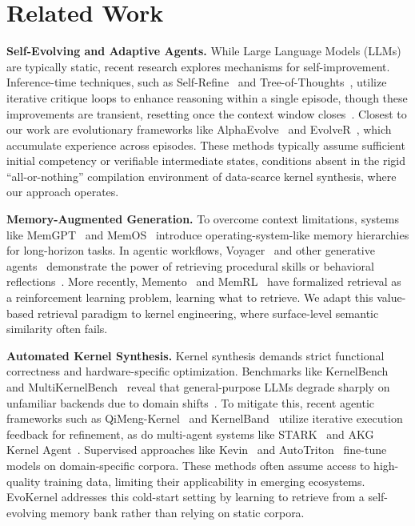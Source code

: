 \documentclass{article} %
\theoremstyle{definition}
\theoremstyle{remark}
\begin{document}
\section{Related Work}
\textbf{Self-Evolving and Adaptive Agents.}
While Large Language Models (LLMs) are typically static, recent research explores mechanisms for self-improvement.
Inference-time techniques, such as Self-Refine~\citep{madaan2023self} and Tree-of-Thoughts~\citep{yao2023tree}, utilize iterative critique loops to enhance reasoning within a single episode, though these improvements are transient, resetting once the context window closes~\citep{shinn2023reflexion}.
Closest to our work are evolutionary frameworks like AlphaEvolve~\citep{novikov2025alphaevolve} and EvolveR~\citep{wu2025evolver}, which accumulate experience across episodes. These methods typically assume sufficient initial competency or verifiable intermediate states, conditions absent in the rigid ``all-or-nothing'' compilation environment of data-scarce kernel synthesis, where our approach operates.

\textbf{Memory-Augmented Generation.}
To overcome context limitations, systems like MemGPT~\citep{packer2023memgpt} and MemOS~\citep{li2025memos, chhikara2025mem0} introduce operating-system-like memory hierarchies for long-horizon tasks. In agentic workflows, Voyager~\citep{wang2023voyager} and other generative agents~\citep{park2023generative, fang2025memp} demonstrate the power of retrieving procedural skills or behavioral reflections~\citep{madaan2022memprompt}. More recently, Memento~\citep{zhou2508memento} and MemRL~\citep{zhang2026memrl} have formalized retrieval as a reinforcement learning problem, learning what to retrieve. We adapt this value-based retrieval paradigm to kernel engineering, where surface-level semantic similarity often fails.

\textbf{Automated Kernel Synthesis.}
Kernel synthesis demands strict functional correctness and hardware-specific optimization. Benchmarks like KernelBench~\citep{ouyang2025kernel} and MultiKernelBench~\citep{wen2025multikernelbench} reveal that general-purpose LLMs degrade sharply on unfamiliar backends due to domain shifts~\citep{li2025tritonbench}. To mitigate this, recent agentic frameworks such as QiMeng-Kernel~\citep{zhu2025qimeng} and KernelBand~\citep{ran2025kernelband} utilize iterative execution feedback for refinement, as do multi-agent systems like STARK~\citep{dong2025stark} and AKG Kernel Agent~\citep{du2025akg}. Supervised approaches like Kevin~\citep{baronio2025kevin} and AutoTriton~\citep{li2025autotriton, woo2025tritonrl} fine-tune models on domain-specific corpora. These methods often assume access to high-quality training data, limiting their applicability in emerging ecosystems. EvoKernel addresses this cold-start setting by learning to retrieve from a self-evolving memory bank rather than relying on static corpora.
\end{document}
